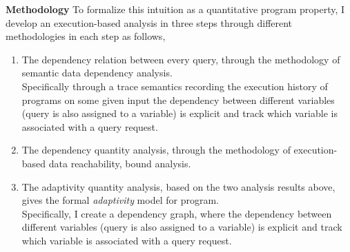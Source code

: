 \begin{itemize}
\textbf{Methodology}
To formalize this intuition as a quantitative program property, I develop an execution-based analysis
 in three steps through different methodologies in each step as follows,
 \begin{enumerate}
 \item The dependency relation between every query, through the methodology of semantic data dependency analysis.
 \\
 Specifically through a trace semantics recording the execution history of programs on some given input
 the dependency between different variables (query is also assigned to a variable) is explicit and track which variable is associated with a query request. 
 \item The dependency quantity analysis, through the methodology of execution-based data reachability, bound analysis.
 \item The adaptivity quantity analysis, based on the two analysis results above, gives the formal \emph{adaptivity} model 
 for program.
 \\
 Specifically, I create a dependency graph, where the dependency between different variables (query is also assigned to a variable) is explicit and track which variable is associated with a query request. 

\end{enumerate}
\end{itemize}
